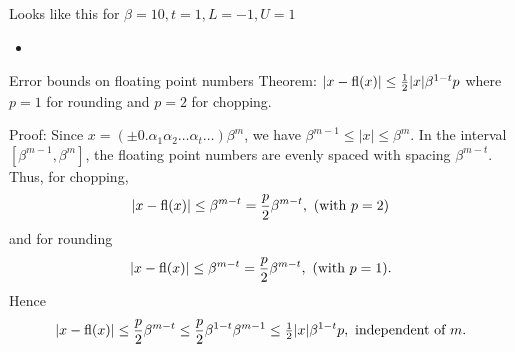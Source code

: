 \documentclass{beamer}
\begin{document}
\begin{frame}{Looks like this for $\beta=10, t=1, L=-1, U=1$}
\begin{itemize}
\item {}
\end{itemize}
\end{frame}


\begin{frame}{Error bounds on floating point numbers}
Theorem: $|x - \text{fl}(x)| \leq \tfrac{1}{2} |x| \beta^{1-t} p$
where $p=1$ for rounding and $p=2$ for chopping.

Proof: Since $x = (\pm 0.\alpha_1 \alpha_2 \ldots \alpha_t \ldots) \beta^m$, we have
$\beta^{m-1} \leq |x| \leq \beta^m$. In the interval $[\beta^{m-1}, \beta^m]$, the floating point numbers
are evenly spaced with spacing $\beta^{m - t}$. Thus, for chopping,
\begin{equation*}
|x - \text{fl}(x)| \leq \beta^{m - t} = \frac{p}{2} \beta^{m-t}, \text{ (with $p = 2$)}
\end{equation*}
and for rounding
\begin{equation*}
|x - \text{fl}(x)| \leq \beta^{m - t} = \frac{p}{2} \beta^{m-t}, \text{ (with $p = 1$)}.
\end{equation*}
Hence
\begin{equation*}
|x - \text{fl}(x)| \leq \frac{p}{2} \beta^{m - t} \leq \frac{p}{2} \beta^{1-t} \beta^{m-1} \leq \tfrac{1}{2} |x| \beta^{1-t} p,\text{ independent of $m$}.
\end{equation*}
\end{frame}
\end{document}

